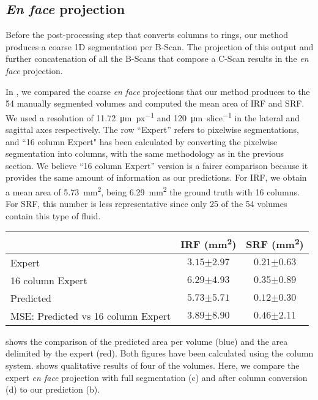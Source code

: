 \subsection{\textit{En face} projection}

Before the post-processing step that converts columns to rings, our method produces a coarse 1D segmentation per B-Scan. The projection of this output and further concatenation of all the B-Scans that compose a C-Scan results in the \textit{en face} projection.

In , we compared the coarse \textit{en face} projections that our method produces to the 54 manually segmented volumes and computed the mean area of IRF and SRF. We used a resolution of \qty{11.72}{\micro\meter\per px} and \qty{120}{\micro\meter\per slice} in the lateral and sagittal axes respectively. The row “Expert” refers to pixelwise segmentations, and ``16 column Expert" has been calculated by converting the pixelwise segmentation into columns, with the same methodology as in the previous section. We believe ``16 column Expert'' version is a fairer comparison because it provides the same amount of information as our predictions. For IRF, we obtain a mean area of \qty{5.73}{\milli\meter^2}, being \qty{6.29}{\milli\meter^2} the ground truth with 16 columns. For SRF, this number is less representative since only 25 of the 54 volumes contain this type of fluid.

\begin{table}[]
\centering
\begin{tabular}{@{}lcc@{}}
\toprule
 & {IRF (\si{\milli\meter^2})} & {SRF (\si{\milli\meter^2})} \\ \midrule
Expert & $3.15{\scriptstyle\pm2.97}$ & $0.21{\scriptstyle\pm0.63}$ \\
16 column Expert & $6.29{\scriptstyle\pm4.93}$ & $0.35{\scriptstyle\pm0.89}$ \\
Predicted & $5.73{\scriptstyle\pm5.71}$ & $0.12{\scriptstyle\pm0.30}$ \\
MSE: Predicted vs 16 column Expert & $3.89{\scriptstyle\pm8.90}$ & $0.46{\scriptstyle\pm2.11}$ \\ \bottomrule
\end{tabular}
\end{table}

 shows the comparison of the predicted area per volume (blue) and the area delimited by the expert (red). Both figures have been calculated using the column system.  shows qualitative results of four of the volumes. Here, we compare the expert \textit{en face} projection with full segmentation (c) and after column conversion (d) to our prediction (b). 

